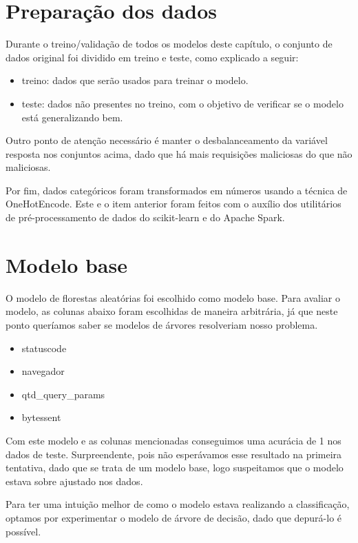 \section{Preparação dos dados}

Durante o treino/validação de todos os modelos deste capítulo, o conjunto de dados original foi dividido 
em treino e teste, como explicado a seguir:

\begin{itemize}
    \item treino: dados que serão usados para treinar o modelo.
    \item teste: dados não presentes no treino, com o objetivo de verificar se o modelo está generalizando bem.
\end{itemize}

Outro ponto de atenção necessário é manter o desbalanceamento da variável resposta nos 
conjuntos acima, dado que há mais requisições maliciosas do que não maliciosas. 

Por fim, dados categóricos foram transformados em números usando a técnica de OneHotEncode. Este e o item
anterior foram feitos com o auxílio dos utilitários de pré-processamento de dados do scikit-learn e do Apache Spark.

\section{Modelo base}

O modelo de florestas aleatórias foi escolhido como modelo base. Para avaliar o modelo, as colunas 
abaixo foram escolhidas de maneira arbitrária, já que neste ponto queríamos saber se modelos de 
árvores resolveriam nosso problema.

\begin{itemize}
    \item statuscode
    \item navegador
    \item qtd\_query\_params
    \item bytessent
\end{itemize}


Com este modelo e as colunas mencionadas conseguimos uma acurácia de 1 nos dados de teste. Surpreendente, pois 
não esperávamos esse resultado na primeira tentativa, dado que se trata de um modelo base, logo suspeitamos 
que o modelo estava sobre ajustado nos dados. 

Para ter uma intuição melhor de como o modelo estava realizando a classificação, optamos por experimentar 
o modelo de árvore de decisão, dado que depurá-lo é possível.

